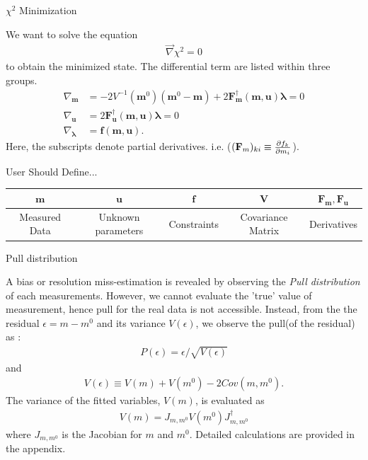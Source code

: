 \documentclass[
	xcolor=dvipsnames,
	aspectratio=169,	
	10pt, 
	]{beamer}
\begin{document}
\begin{frame}{$\chi^2$ Minimization}
	\begin{block}{}
		We want to solve the equation
		\begin{align}
			\vec \nabla \chi^2 =0
		\end{align}
		to obtain the minimized state. The differential term are listed within three groups.
		\begin{align}
			\nabla_{\mathbf m} &= -2 V^{-1}(\mathbf m^0)(\mathbf m^0-\mathbf m) + 2 \mathbf F_\mathbf m^\dagger(\mathbf{m,u})\mathbf\lambda=0\label{GradM}\\
			\nabla_{\mathbf u} &= 2\mathbf F_\mathbf u^\dagger(\mathbf{m,u})\mathbf \lambda =0\label{GradU}\\
			\nabla_{\mathbf \lambda}& = \mathbf f(\mathbf{m,u})\label{GradL}.
		\end{align}
		Here, the subscripts denote partial derivatives. i.e. ($(\mathbf {F}_m)_{ki}\equiv\frac{\partial f_k}{\partial m_i}$).
	\end{block}
	\begin{block}{User Should Define...}
		\begin{table}
			\begin{tabular}{c|c|c|c|c}
				$\mathbf{m}$&$\mathbf{u}$&$\mathbf{f}$&$\mathbf{V}$&$\mathbf{F_m},\mathbf{F_u}$\\\hline
				Measured Data&Unknown parameters&Constraints&Covariance Matrix&Derivatives
			\end{tabular}
		\end{table}
	\end{block}
\end{frame}
\begin{frame}{Pull distribution}
	\begin{block}{}
		A bias or resolution miss-estimation is revealed by observing the \textit{Pull distribution} of each measurements. However, we cannot evaluate the 'true' value of measurement, hence pull for the real data is not accessible. Instead, from the the residual $\epsilon = m-m^0$ and its variance $V(\epsilon)$, we observe the pull(of the residual) as :
		\begin{align}
			P(\epsilon) = \epsilon/\sqrt{V(\epsilon)}\label{Pull}
		\end{align}
		and
		\begin{align}
			V(\epsilon) \equiv V(m)+ V(m^0) - 2 Cov(m,m^0).\label{Ve}
		\end{align}
		The variance of the fitted variables, $V(m)$, is evaluated as
		\begin{align}
			V(m) = J_{m,m^0}V(m^0) J^\dagger_{m,m^0} 
		\end{align}
		 where $J_{m,m^0}$ is the Jacobian for $m$ and $m^0$. Detailed calculations are provided in the appendix. 
	\end{block}
\end{frame} 
\end{document}
